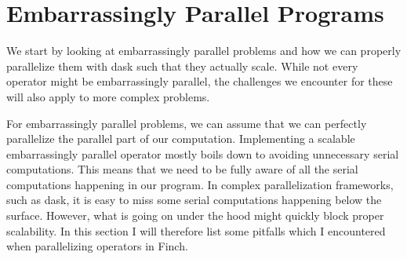 \section{Embarrassingly Parallel Programs}

We start by looking at embarrassingly parallel problems and how we can properly parallelize them with dask such that they actually scale.
While not every operator might be embarrassingly parallel, the challenges we encounter for these will also apply to more complex problems.

For embarrassingly parallel problems, we can assume that we can perfectly parallelize the parallel part of our computation.
Implementing a scalable embarrassingly parallel operator mostly boils down to avoiding unnecessary serial computations.
This means that we need to be fully aware of all the serial computations happening in our program.
In complex parallelization frameworks, such as dask, it is easy to miss some serial computations happening below the surface.
However, what is going on under the hood might quickly block proper scalability.
In this section I will therefore list some pitfalls which I encountered when parallelizing operators in Finch.







